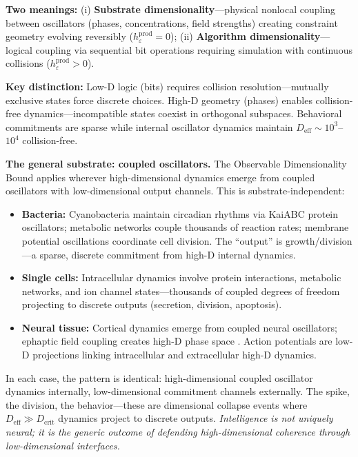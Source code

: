 \documentclass[12pt]{article}
\begin{document}
\textbf{Two meanings:} (i) \textbf{Substrate dimensionality}—physical nonlocal coupling between oscillators (phases, concentrations, field strengths) creating constraint geometry evolving reversibly ($h_\varepsilon^{\text{prod}} = 0$); (ii) \textbf{Algorithm dimensionality}—logical coupling via sequential bit operations requiring simulation with continuous collisions ($h_\varepsilon^{\text{prod}} > 0$).

\textbf{Key distinction:} Low-D logic (bits) requires collision resolution—mutually exclusive states force discrete choices. High-D geometry (phases) enables collision-free dynamics—incompatible states coexist in orthogonal subspaces. Behavioral commitments are sparse while internal oscillator dynamics maintain $D_{\text{eff}} \sim 10^3$--$10^4$ collision-free.

\textbf{The general substrate: coupled oscillators.} The Observable Dimensionality Bound applies wherever high-dimensional dynamics emerge from coupled oscillators with low-dimensional output channels. This is substrate-independent:
\begin{itemize}
\item \textbf{Bacteria:} Cyanobacteria maintain circadian rhythms via KaiABC protein oscillators; metabolic networks couple thousands of reaction rates; membrane potential oscillations coordinate cell division. The ``output'' is growth/division—a sparse, discrete commitment from high-D internal dynamics.
\item \textbf{Single cells:} Intracellular dynamics involve protein interactions, metabolic networks, and ion channel states—thousands of coupled degrees of freedom projecting to discrete outputs (secretion, division, apoptosis).
\item \textbf{Neural tissue:} Cortical dynamics emerge from coupled neural oscillators; ephaptic field coupling creates high-D phase space \cite{miller2024,pinotsis2023ephaptic}. Action potentials are low-D projections linking intracellular and extracellular high-D dynamics.
\end{itemize}

In each case, the pattern is identical: high-dimensional coupled oscillator dynamics internally, low-dimensional commitment channels externally. The spike, the division, the behavior—these are dimensional collapse events where $D_{\text{eff}} \gg D_{\text{crit}}$ dynamics project to discrete outputs. \textit{Intelligence is not uniquely neural; it is the generic outcome of defending high-dimensional coherence through low-dimensional interfaces.}
\end{document}
